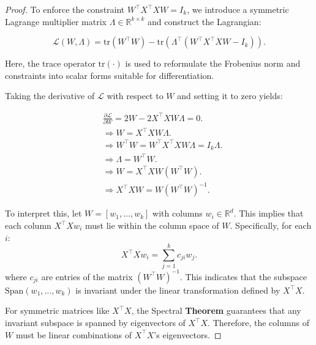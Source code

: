 \documentclass{article}
\begin{document}
\begin{proof}

To enforce the constraint \(W^\top X^\top X W = I_k\), we introduce a symmetric Lagrange multiplier matrix \(\Lambda \in \mathbb{R}^{k \times k}\) and construct the Lagrangian:

\begin{equation}
    \mathcal{L}(W, \Lambda) = \text{tr}(W^\top W) - \text{tr}\left(\Lambda^\top (W^\top X^\top X W - I_k)\right).    
\end{equation}

Here, the trace operator \(\text{tr}(\cdot)\) is used to reformulate the Frobenius norm and constraints into scalar forms suitable for differentiation.


Taking the derivative of \(\mathcal{L}\) with respect to \(W\) and setting it to zero yields:

\begin{equation}
\begin{aligned}
 & \frac{\partial \mathcal{L}}{\partial W} = 2W - 2 X^\top X W \Lambda = 0. \\
& \Rightarrow W = X^\top X W \Lambda. \\
& \Rightarrow W^\top W = W^\top X^\top X W \Lambda = I_k \Lambda . \\
& \Rightarrow  \Lambda = W^\top W. \\
& \Rightarrow   W = X^\top X W (W^\top W). \\
& \Rightarrow  X^\top X W = W (W^\top W)^{-1}.
\end{aligned}
\end{equation}



To interpret this, let \(W = [w_1, \dots, w_k]\) with columns \(w_i \in \mathbb{R}^d\). This implies that each column \(X^\top X w_i\) must lie within the column space of \(W\). Specifically, for each \(i\):
\begin{equation}
    X^\top X w_i = \sum_{j=1}^k c_{ji} w_j.    
\end{equation}
where \(c_{ji}\) are entries of the matrix \((W^\top W)^{-1}\). This indicates that the subspace \(\text{Span}(w_1, \dots, w_k)\) is invariant under the linear transformation defined by \(X^\top X\).

For symmetric matrices like \(X^\top X\), the Spectral \textbf{Theorem} guarantees that any invariant subspace is spanned by eigenvectors of \(X^\top X\). Therefore, the columns of \(W\) must be linear combinations of \(X^\top X\)'s eigenvectors.



\end{proof}
\end{document}
